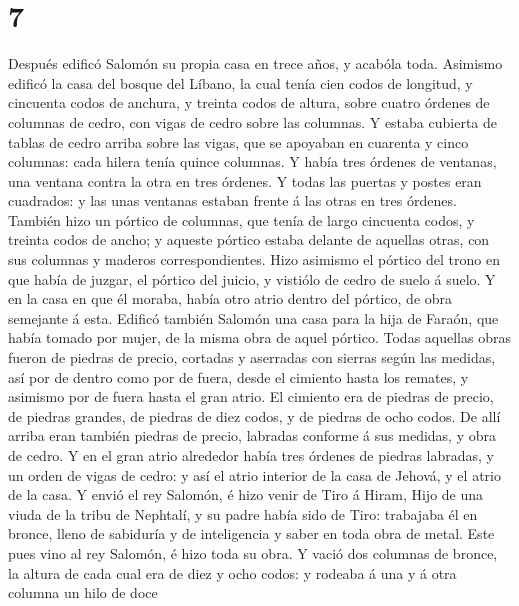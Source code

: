 \hypertarget{section-6}{%
\section{7}\label{section-6}}

 Después edificó Salomón su propia casa en trece años, y
acabóla toda.  Asimismo edificó la casa del bosque del
Líbano, la cual tenía cien codos de longitud, y cincuenta codos de
anchura, y treinta codos de altura, sobre cuatro órdenes de columnas de
cedro, con vigas de cedro sobre las columnas.  Y estaba
cubierta de tablas de cedro arriba sobre las vigas, que se apoyaban en
cuarenta y cinco columnas: cada hilera tenía quince columnas.
 Y había tres órdenes de ventanas, una ventana contra la
otra en tres órdenes.  Y todas las puertas y postes eran
cuadrados: y las unas ventanas estaban frente á las otras en tres
órdenes.  También hizo un pórtico de columnas, que tenía de
largo cincuenta codos, y treinta codos de ancho; y aqueste pórtico
estaba delante de aquellas otras, con sus columnas y maderos
correspondientes.  Hizo asimismo el pórtico del trono en que
había de juzgar, el pórtico del juicio, y vistiólo de cedro de suelo á
suelo.  Y en la casa en que él moraba, había otro atrio
dentro del pórtico, de obra semejante á esta. Edificó también Salomón
una casa para la hija de Faraón, que había tomado por mujer, de la misma
obra de aquel pórtico.  Todas aquellas obras fueron de
piedras de precio, cortadas y aserradas con sierras según las medidas,
así por de dentro como por de fuera, desde el cimiento hasta los
remates, y asimismo por de fuera hasta el gran atrio.  El
cimiento era de piedras de precio, de piedras grandes, de piedras de
diez codos, y de piedras de ocho codos.  De allí arriba
eran también piedras de precio, labradas conforme á sus medidas, y obra
de cedro.  Y en el gran atrio alrededor había tres órdenes
de piedras labradas, y un orden de vigas de cedro: y así el atrio
interior de la casa de Jehová, y el atrio de la casa.  Y
envió el rey Salomón, é hizo venir de Tiro á Hiram,  Hijo
de una viuda de la tribu de Nephtalí, y su padre había sido de Tiro:
trabajaba él en bronce, lleno de sabiduría y de inteligencia y saber en
toda obra de metal. Este pues vino al rey Salomón, é hizo toda su obra.
 Y vació dos columnas de bronce, la altura de cada cual era
de diez y ocho codos: y rodeaba á una y á otra columna un hilo de doce
